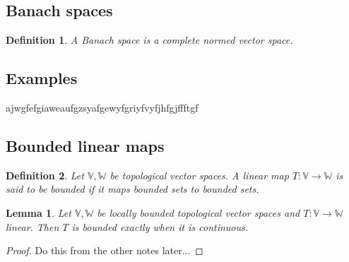 \documentclass{article}
\newtheorem{lemma}{Lemma}[subsection]
\newtheorem{definition}{Definition}[subsection]
\begin{document}
\subsection{Banach spaces}
\begin{definition}
  A Banach space is a complete normed vector space.
\end{definition}
\subsection{Examples}
ajwgfefgiaweaufgzsyafgewyfgriyfvyfjhfgjffftgf
\subsection{Bounded linear maps}
\begin{definition}
  Let $\mathbb V,\mathbb W$ be topological vector spaces.  A linear map $T:\mathbb V\rightarrow\mathbb W$ is said to be bounded if it maps bounded sets to bounded sets.
\end{definition}
\begin{lemma}
  Let $\mathbb V,\mathbb W$ be locally bounded topological vector spaces and $T:\mathbb V\rightarrow\mathbb W$ linear.  Then $T$ is bounded exactly when it is continuous.
\end{lemma}
\begin{proof}
  Do this from the other notes later...
\end{proof}
\end{document}

